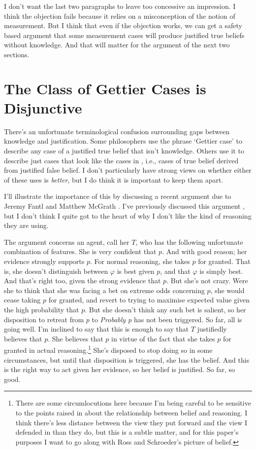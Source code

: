 {I don't want the last two paragraphs to leave too concessive an impression. I think the objection fails because it relies on a misconception of the notion of measurement. But I think that even if the objection works, we can get a safety based argument that some measurement cases will produce justified true beliefs without knowledge. And that will matter for the argument of the next two sections.}

\section{The Class of Gettier Cases is Disjunctive}

There's an unfortunate terminological confusion surrounding gaps between knowledge and justification. Some philosophers use the phrase `Gettier case' to describe any case of a justified true belief that isn't knowledge. Others use it to describe just cases that look like the cases in \citet{Gettier1963}, i.e., cases of true belief derived from justified false belief. I don't particularly have strong views on whether either of these uses is \textit{better}, but I do think it is important to keep them apart.

I'll illustrate the importance of this by discussing a recent argument due to Jeremy Fantl and Matthew McGrath \citep[Ch. 4]{FantlMcGrath2009}. I've previously discussed this argument \citep{Weatherson2011-WEAKBI}, but I don't think I quite got to the heart of why I don't like the kind of reasoning they are using.

The argument concerns an agent, call her $T$, who has the following unfortunate combination of features. She is very confident that $p$. And with good reason; her evidence strongly supports $p$. For normal reasoning, she takes $p$ for granted. That is, she doesn't distinguish between $\varphi$ is best given $p$, and that $\varphi$ is simply best. And that's right too, given the strong evidence that $p$. But she's not crazy. Were she to think that she was facing a bet on extreme odds concerning $p$, she would cease taking $p$ for granted, and revert to trying to maximise expected value given the high probability that $p$. But she doesn't think any such bet is salient, so her disposition to retreat from $p$ to \textit{Probably p} has not been triggered. So far, all is going well. I'm inclined to say that this is enough to say that $T$ justifiedly believes that $p$. She believes that $p$ in virtue of the fact that she takes $p$ for granted in actual reasoning.\footnote{There are some circumlocutions here because I'm being careful to be sensitive to the points raised in \citet{SchroederRoss2012} about the relationship between belief and reasoning. I think there's less distance between the view they put forward and the view I defended in \citet{Weatherson2005-WEACWD} than they do, but this is a subtle matter, and for this paper's purposes I want to go along with Ross and Schroeder's picture of belief.} She's disposed to stop doing so in some circumstances, but until that disposition is triggered, she has the belief. And this is the right way to act given her evidence, so her belief is justified. So far, so good.

